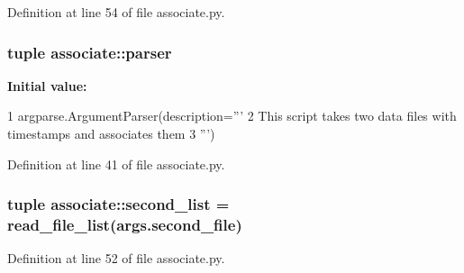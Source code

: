 \-Definition at line 54 of file associate.\-py.

\subsubsection[{parser}]{\setlength{\rightskip}{0pt plus 5cm}tuple {\bf associate\-::parser}}\label{namespaceassociate_ae72f0b675b65214fe56c44cd8b001d59}
{\bfseries \-Initial value\-:}
\begin{DoxyCode}
1 argparse.ArgumentParser(description='''
2     This script takes two data files with timestamps and associates them   
3     ''')
\end{DoxyCode}


\-Definition at line 41 of file associate.\-py.

\subsubsection[{second\-\_\-list}]{\setlength{\rightskip}{0pt plus 5cm}tuple {\bf associate\-::second\-\_\-list} = {\bf read\-\_\-file\-\_\-list}(args.\-second\-\_\-file)}\label{namespaceassociate_aaa1fc44fba545ad5b4ba6b979bdbd5ea}


\-Definition at line 52 of file associate.\-py.

